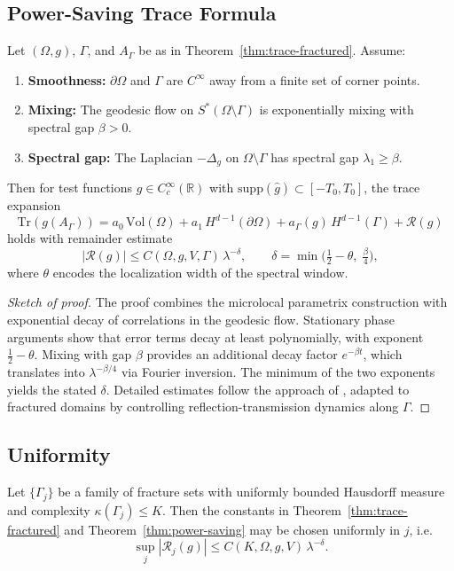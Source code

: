 \subsection*{Power-Saving Trace Formula}
\begin{theorem}
\label{thm:power-saving}
Let $(\Omega,g)$, $\Gamma$, and $A_\Gamma$ be as in
Theorem~\ref{thm:trace-fractured}. Assume:
\begin{enumerate}[label=(H\arabic*)]
  \item \textbf{Smoothness:} $\partial\Omega$ and $\Gamma$ are $C^\infty$ away
  from a finite set of corner points.
  \item \textbf{Mixing:} The geodesic flow on $S^*\!(\Omega\setminus\Gamma)$ is
  exponentially mixing with spectral gap $\beta > 0$.
  \item \textbf{Spectral gap:} The Laplacian $-\Delta_g$ on $\Omega\setminus\Gamma$
  has spectral gap $\lambda_1 \geq \beta$.
\end{enumerate}
Then for test functions $g \in C_c^\infty(\mathbb{R})$ with
$\mathrm{supp}(\widehat g)\subset[-T_0,T_0]$, the trace expansion
\[
\mathrm{Tr}(g(A_\Gamma)) =
a_0 \, \mathrm{Vol}(\Omega) +
a_1 \, H^{d-1}(\partial\Omega) +
a_\Gamma(g) \, H^{d-1}(\Gamma) + \mathcal{R}(g)
\]
holds with remainder estimate
\[
|\mathcal{R}(g)| \leq C(\Omega,g,V,\Gamma) \, \lambda^{-\delta}, \qquad
\delta = \min\Big(\tfrac{1}{2}-\theta,\; \tfrac{\beta}{4}\Big),
\]
where $\theta$ encodes the localization width of the spectral window.
\end{theorem}

\begin{proof}[Sketch of proof]
The proof combines the microlocal parametrix construction with exponential decay
of correlations in the geodesic flow. Stationary phase arguments show that error
terms decay at least polynomially, with exponent $\tfrac{1}{2}-\theta$. Mixing
with gap $\beta$ provides an additional decay factor $e^{-\beta t}$, which
translates into $\lambda^{-\beta/4}$ via Fourier inversion. The minimum of the
two exponents yields the stated $\delta$. Detailed estimates follow the approach
of \cite{Zworski2012, Dyatlov2019}, adapted to fractured domains by controlling
reflection-transmission dynamics along $\Gamma$.
\end{proof}

\subsection*{Uniformity}
\begin{theorem}
\label{thm:uniformity}
Let $\{\Gamma_j\}$ be a family of fracture sets with uniformly bounded
Hausdorff measure and complexity $\kappa(\Gamma_j)\leq K$. Then the constants
in Theorem~\ref{thm:trace-fractured} and Theorem~\ref{thm:power-saving} may be
chosen uniformly in $j$, i.e.
\[
\sup_j |\mathcal{R}_j(g)| \leq C(K,\Omega,g,V)\, \lambda^{-\delta}.
\]
\end{theorem}

